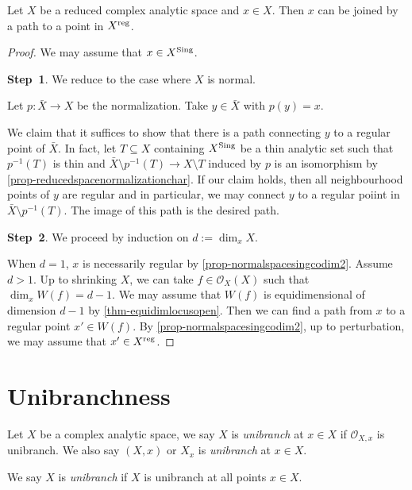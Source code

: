 \begin{proposition}\label{prop-pathtoXreg}
    Let $X$ be a reduced complex analytic space and $x\in X$. Then $x$ can be joined by a path to a point in $X^{\operatorname{reg}}$.
\end{proposition}
\begin{proof}
    We may assume that $x\in X^{\operatorname{Sing}}$. 
    
    \textbf{Step~1}. We reduce to the case where $X$ is normal.

    Let $p:\bar{X}\rightarrow X$ be the normalization. Take $y\in \bar{X}$ with $p(y)=x$. 
    
    We claim that it suffices to show that there is a path connecting $y$ to a regular point of $\bar{X}$. In fact, let $T\subseteq X$ containing $X^{\operatorname{Sing}}$ be a thin analytic set such that $p^{-1}(T)$ is thin and $\bar{X}\setminus p^{-1}(T)\rightarrow X\setminus T$ induced by $p$ is an isomorphism by \cref{prop-reducedspacenormalizationchar}.
    If our claim holds, then all neighbourhood points of $y$ are regular and in particular, we may connect $y$ to a regular poiint in $\bar{X}\setminus p^{-1}(T)$. The image of this path is the desired path.

    \textbf{Step~2}. We proceed by induction on $d:=\dim_x X$.
    
    When $d=1$, $x$ is necessarily regular by \cref{prop-normalspacesingcodim2}. Assume $d>1$. 
    Up to shrinking $X$, we can take $f\in \mathcal{O}_X(X)$ such that $\dim_x W(f)=d-1$. We may assume that $W(f)$ is equidimensional of dimension $d-1$ by \cref{thm-equidimlocusopen}. Then we can find a path from $x$ to a regular point $x'\in W(f)$. By \cref{prop-normalspacesingcodim2}, up to perturbation, we may assume that $x'\in X^{\operatorname{reg}}$. 
\end{proof}


\section{Unibranchness}
\begin{definition}
    Let $X$ be a complex analytic space, we say $X$ is \emph{unibranch} at $x\in X$ if $\mathcal{O}_{X,x}$ is unibranch. We also say $(X,x)$ or $X_x$ is \emph{unibranch} at $x\in X$.

    We say $X$ is \emph{unibranch} if $X$ is unibranch at all points $x\in X$. 
\end{definition}

